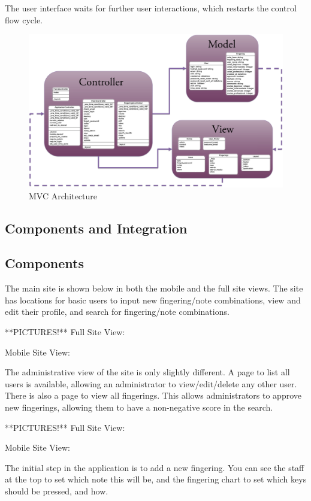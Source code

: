 \documentclass[12pt,english]{article}
\begin{document}
The user interface waits for further user interactions, which restarts
the control flow cycle.

\begin{figure}[H]
\caption{MVC Architecture}


\includegraphics[scale=0.15]{MVC} 
\end{figure}



\subsection{Components and Integration}

\subsection{Components}
The main site is shown below in both the mobile and the full site views.
The site has locations for basic users to input new fingering/note
combinations, view and edit their profile, and search for fingering/note
combinations.

**PICTURES!**
Full Site View:

Mobile Site View:

The administrative view of the site is only slightly different. A page to
list all users is available, allowing an administrator to view/edit/delete
any other user. There is also a page to view all fingerings.  This allows
administrators to approve new fingerings, allowing them to have a non-negative
score in the search.

**PICTURES!**
Full Site View:

Mobile Site View:


The initial step in the application is to add a new fingering. You can see the
staff at the top to set which note this will be, and the fingering chart to
set which keys should be pressed, and how.
\end{document}
